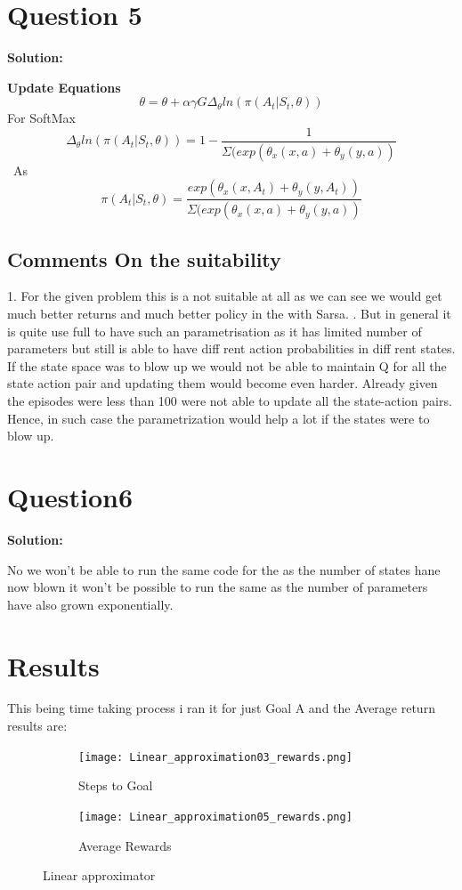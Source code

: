 \documentclass[12pt, letterpaper, twoside]{report}
\begin{document}
\newpage
\section*{Question 5}
\textbf{Solution:} 

\textbf{Update Equations} 
 \[ \theta = \theta + \alpha \gamma G \Delta_\theta ln(\pi(A_t|S_t,\theta))\]
 For SoftMax
 \[ \Delta_\theta ln(\pi(A_t|S_t,\theta)) = 1 - \frac{1}{\Sigma(exp(\theta_x(x,a) +  \theta_y(y,a))}\]\
 As 
 \[ \pi(A_t|S_t,\theta) = \frac{exp(\theta_x(x,A_t) +  \theta_y(y,A_t))}{\Sigma(exp(\theta_x(x,a) +  \theta_y(y,a))} \]
\subsection*{Comments On the suitability}\par
1. For the given problem this is a not suitable at all as we can see we would get much better returns and much better policy in the with Sarsa. \newline
2. But in general it is quite use full to have such an parametrisation as it has limited number of parameters but still is able to have diff rent action probabilities in diff rent states. If the state space was to blow up we would not be able to maintain Q for all the state action pair and updating them would become even harder. Already given the episodes were less than 100 were not able to update all the state-action pairs. Hence, in such case the parametrization would help a lot if the states were to blow up.
\section*{Question6}
\textbf{Solution:} \par 
 No we won't be able to run the same code for the as the number of states hane now blown it won't be possible to run the same as the number of parameters have also grown exponentially.
 
 \section*{Results}
 This being time taking process i ran it for just Goal A  and the Average return results are:
 \begin{figure}[h!]
  \centering
  \begin{subfigure}[b]{0.5\linewidth}
    \texttt{[image: Linear\_approximation03\_rewards.png]}
    \caption{Steps to Goal}
  \end{subfigure}
  \begin{subfigure}[b]{0.5\linewidth}
    \texttt{[image: Linear\_approximation05\_rewards.png]}
    \caption{Average Rewards}
  \end{subfigure}
  \caption{Linear approximator}
  \label{fig:Softamx}
\end{figure}
\end{document}

